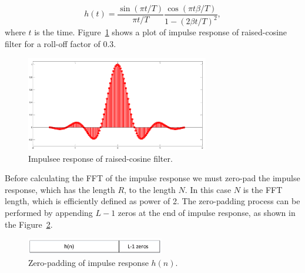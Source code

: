 \documentclass[a4paper]{article}
\begin{document}
\begin{equation}
    h(t)= \frac{\sin(\pi t/T)}{\pi t/T}\frac{\cos(\pi t \beta/T)}{1-(2\beta t/T)^2},
    \label{hn}
\end{equation}
where $t$ is the time. Figure~\ref{td_rc} shows a plot of impulse response of raised-cosine filter for a roll-off factor of 0.3.
\begin{figure}[h!]
    \centering
    \includegraphics[width=8cm]{rc-td-filter-stemv2}
    \caption{Impulsee response of raised-cosine filter.}
    \label{td_rc}
\end{figure}
Before calculating the FFT of the impulse response we must zero-pad the impulse response, which has the length $R$, to the length $N$. In this case $N$ is the FFT length, which is efficiently defined as power of 2. The zero-padding process can be performed by appending $L-1$ zeros at the end of impulse response, as shown in the Figure~\ref{zp-hn}.

\begin{figure}[t!]
    \centering
    \includegraphics[width=6cm]{zp-hn}
    \caption{Zero-padding of impulse response $h(n)$.}
    \label{zp-hn}
\end{figure}
\end{document}
